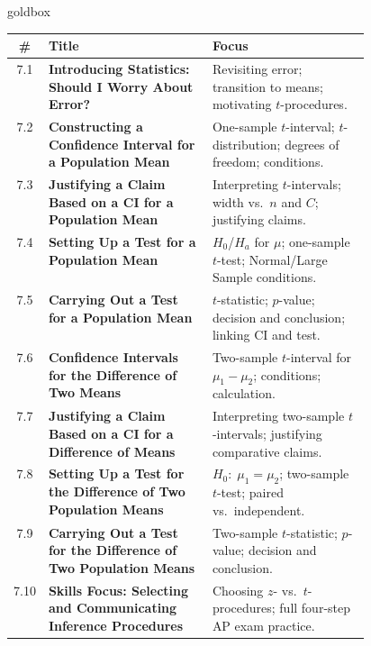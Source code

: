 \documentclass[10pt]{article}
\begin{document}
\renewcommand{\arraystretch}{1.35}
\begin{skillbox}{goldbox}
\small
\begin{tabularx}{\linewidth}{@{} c >{\bfseries}p{0.46\linewidth} X @{}}
  \textbf{\#} & \textbf{Title} & \textbf{Focus} \\
  \hline
  7.1  & Introducing Statistics: Should I Worry About Error?
       & Revisiting error; transition to means; motivating $t$-procedures. \\
  \hline
  7.2  & Constructing a Confidence Interval for a Population Mean
       & One-sample $t$-interval; $t$-distribution; degrees of freedom; conditions. \\
  \hline
  7.3  & Justifying a Claim Based on a CI for a Population Mean
       & Interpreting $t$-intervals; width vs.\ $n$ and $C$; justifying claims. \\
  \hline
  7.4  & Setting Up a Test for a Population Mean
       & $H_0$/$H_a$ for $\mu$; one-sample $t$-test; Normal/Large Sample conditions. \\
  \hline
  7.5  & Carrying Out a Test for a Population Mean
       & $t$-statistic; $p$-value; decision and conclusion; linking CI and test. \\
  \hline
  7.6  & Confidence Intervals for the Difference of Two Means
       & Two-sample $t$-interval for $\mu_1 - \mu_2$; conditions; calculation. \\
  \hline
  7.7  & Justifying a Claim Based on a CI for a Difference of Means
       & Interpreting two-sample $t$-intervals; justifying comparative claims. \\
  \hline
  7.8  & Setting Up a Test for the Difference of Two Population Means
       & $H_0{:}\;\mu_1 = \mu_2$; two-sample $t$-test; paired vs.\ independent. \\
  \hline
  7.9  & Carrying Out a Test for the Difference of Two Population Means
       & Two-sample $t$-statistic; $p$-value; decision and conclusion. \\
  \hline
  7.10 & Skills Focus: Selecting and Communicating Inference Procedures
       & Choosing $z$- vs.\ $t$-procedures; full four-step AP exam practice. \\
  \hline
\end{tabularx}
\end{skillbox}

\vspace{0.12in}
\end{document}
